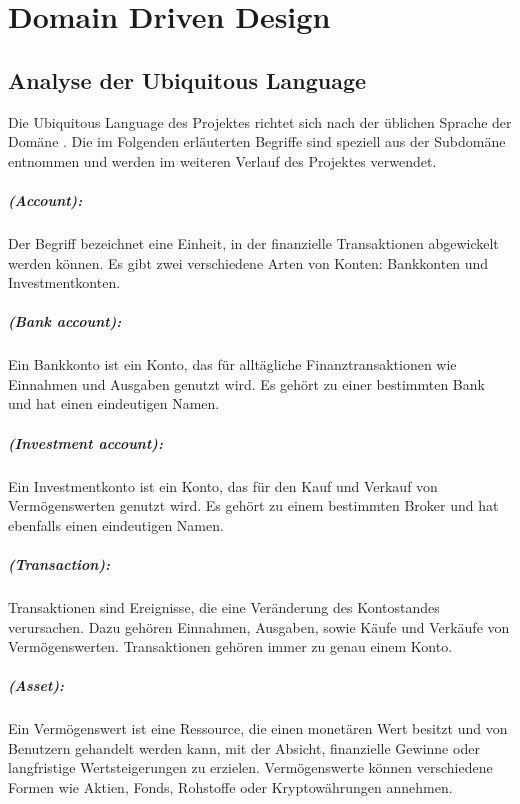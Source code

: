 \chapter{Domain Driven Design}

\section{Analyse der Ubiquitous Language}

Die Ubiquitous Language des Projektes richtet sich nach der üblichen Sprache der Domäne . Die im Folgenden erläuterten Begriffe sind speziell aus der Subdomäne  entnommen und werden im weiteren Verlauf des Projektes verwendet.

\paragraph*{ (Account):} Der Begriff bezeichnet eine Einheit, in der finanzielle Transaktionen abgewickelt werden können. Es gibt zwei verschiedene Arten von Konten: Bankkonten und Investmentkonten.

\paragraph*{ (Bank account):} Ein Bankkonto ist ein Konto, das für alltägliche Finanztransaktionen wie Einnahmen und Ausgaben genutzt wird. Es gehört zu einer bestimmten Bank und hat einen eindeutigen Namen.

\paragraph*{ (Investment account):}  Ein Investmentkonto ist ein Konto, das für den Kauf und Verkauf von Vermögenswerten genutzt wird. Es gehört zu einem bestimmten Broker und hat ebenfalls einen eindeutigen Namen.

\paragraph*{ (Transaction):} Transaktionen sind Ereignisse, die eine Veränderung des Kontostandes verursachen. Dazu gehören Einnahmen, Ausgaben, sowie Käufe und Verkäufe von Vermögenswerten. Transaktionen gehören immer zu genau einem Konto.

\paragraph*{ (Asset):} Ein Vermögenswert ist eine Ressource, die einen monetären Wert besitzt und von Benutzern gehandelt werden kann, mit der Absicht, finanzielle Gewinne oder langfristige Wertsteigerungen zu erzielen. Vermögenswerte können verschiedene Formen wie Aktien, Fonds, Rohstoffe oder Kryptowährungen annehmen.

